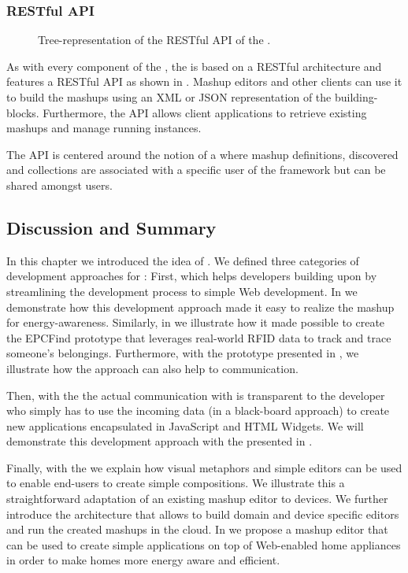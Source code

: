 \subsubsection{RESTful API}
\begin{figure}
\caption{Tree-representation of the RESTful API of the \pMashupsFw{}.}
\label{fig:mashupFworkAPI}
\end{figure}
As with every component of the \WoTA{}, the \pMashupsFw{} is based on a RESTful architecture and features a RESTful API as shown in . Mashup editors and other clients can use it to build the mashups using an XML or JSON representation of the building-blocks. Furthermore, the API allows client applications to retrieve existing mashups and manage running instances.

The API is centered around the notion of a  where mashup definitions, discovered \sts{} and collections are associated with a specific user of the framework but can be shared amongst users.

\subsection{Discussion and Summary}
In this chapter we introduced the idea of \pMashups{}. We defined three categories of development approaches for \pMashups{}: First, \newterm{\mashupLevelA{}} which helps developers building upon \sts{} by streamlining the development process to simple Web development. In  we demonstrate how this development approach made it easy to realize the  mashup for energy-awareness. Similarly, in  we illustrate how it made possible to create the EPCFind prototype that leverages real-world RFID data to track and trace someone's belongings. Furthermore, with the  prototype presented in , we illustrate how the approach can also help \sts{} to \sts{} communication.

Then, with the \newterm{\mashupLevelB{}} the actual communication with \sts{} is transparent to the developer who simply has to use the incoming data (in a black-board approach) to create new applications encapsulated in JavaScript and HTML Widgets. We will demonstrate this development approach with the  presented in .

Finally, with the \newterm{\mashupLevelC{}} we explain how visual metaphors and simple editors can be used to enable end-users to create simple compositions. We illustrate this a straightforward adaptation of an existing mashup editor to \WoT{} devices. We further introduce the \pMashupsFw{} architecture that allows to build domain and device specific \pMashups{} editors and run the created mashups in the cloud. In  we propose a mashup editor that can be used to create simple applications on top of Web-enabled home appliances in order to make homes more energy aware and efficient.